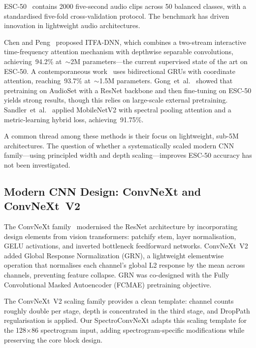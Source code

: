 \documentclass{article}
\begin{document}
ESC-50~\citep{piczark2015esc50} contains 2000 five-second audio clips across 50
balanced classes, with a standardised five-fold cross-validation protocol. The
benchmark has driven innovation in lightweight audio architectures.

Chen and Peng~\citep{chen2025itfa} proposed ITFA-DNN, which combines a
two-stream interactive time-frequency attention mechanism with depthwise
separable convolutions, achieving~94.2\% at~$\sim$2M parameters---the current
supervised state of the art on ESC-50. A contemporaneous
work~\citep{crnncoordatt2026} uses bidirectional GRUs with coordinate
attention, reaching~93.7\% at~$\sim$1.5M parameters. Gong~et~al.~\citep{gong2021psla}
showed that pretraining on AudioSet with a ResNet backbone and then fine-tuning
on ESC-50 yields strong results, though this relies on large-scale external
pretraining. Sandler~et~al.~\citep{mobilenetv2spa2025} applied MobileNetV2 with
spectral pooling attention and a metric-learning hybrid loss, achieving~91.75\%.

A common thread among these methods is their focus on lightweight, sub-5M
architectures. The question of whether a systematically scaled modern CNN
family---using principled width and depth scaling---improves ESC-50 accuracy has
not been investigated.

\subsection{Modern CNN Design: ConvNeXt and ConvNeXt~V2}

The ConvNeXt family~\citep{liu2022convnext} modernised the ResNet architecture
by incorporating design elements from vision transformers: patchify stem, layer
normalisation, GELU activations, and inverted bottleneck feedforward networks.
ConvNeXt~V2~\citep{woo2023convnextv2} added Global Response Normalization
(GRN), a lightweight elementwise operation that normalises each channel's global
L2 response by the mean across channels, preventing feature collapse. GRN was
co-designed with the Fully Convolutional Masked Autoencoder (FCMAE) pretraining
objective.

The ConvNeXt~V2 scaling family provides a clean template: channel counts roughly
double per stage, depth is concentrated in the third stage, and DropPath
regularisation is applied. Our SpectroConvNeXt adapts this scaling template for
the 128$\times$86 spectrogram input, adding spectrogram-specific modifications
while preserving the core block design.
\end{document}
